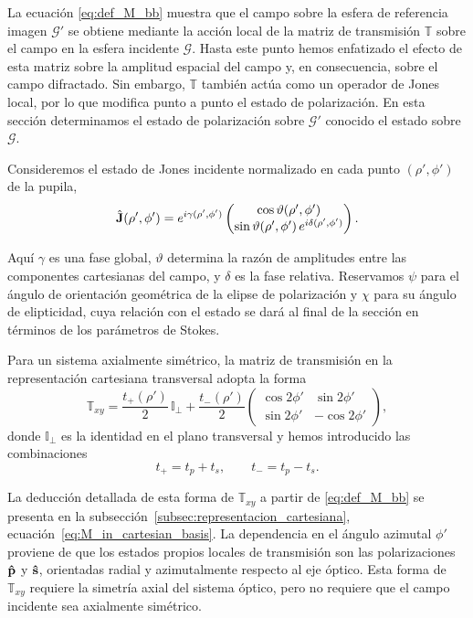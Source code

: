 La ecuación \eqref{eq:def_M_bb} muestra que el campo sobre la esfera de
referencia imagen $\mathscr{G}'$ se obtiene mediante la acción local de la
matriz de transmisión $\mathbb{T}$ sobre el campo en la esfera incidente
$\mathscr{G}$. Hasta este punto hemos enfatizado el efecto de esta matriz
sobre la amplitud espacial del campo y, en consecuencia, sobre el campo
difractado. Sin embargo, $\mathbb{T}$ también actúa como un operador de Jones
local, por lo que modifica punto a punto el estado de polarización. En esta
sección determinamos el estado de polarización sobre $\mathscr{G}'$
conocido el estado sobre $\mathscr{G}$.

Consideremos el estado de Jones incidente normalizado en cada punto
$(\rho',\phi')$ de la pupila,
\begin{equation}
\hat{\vb J}(\rho',\phi')
=
e^{i\gamma(\rho',\phi')}
\begin{pmatrix}
\cos \vartheta(\rho',\phi') \\
\sin \vartheta(\rho',\phi')\, e^{i\delta(\rho',\phi')}
\end{pmatrix}.
\label{eq:jones_state_pupila}
\end{equation}

Aquí $\gamma$ es una fase global, $\vartheta$ determina la razón de
amplitudes entre las componentes cartesianas del campo, y $\delta$ es la fase
relativa. Reservamos $\psi$ para el ángulo de orientación geométrica de la
elipse de polarización y $\chi$ para su ángulo de elipticidad, cuya relación
con el estado se dará al final de la sección en términos de los parámetros
de Stokes.

Para un sistema axialmente simétrico, la matriz de transmisión en la
representación cartesiana transversal adopta la forma
\begin{equation}
\mathbb{T}_{xy}
=
\frac{t_+(\rho')}{2}\,\mathbb{I}_{\perp}
+
\frac{t_-(\rho')}{2}
\begin{pmatrix}
\cos 2\phi' & \sin 2\phi' \\
\sin 2\phi' & -\cos 2\phi'
\end{pmatrix},
\label{eq:T_xy_jones}
\end{equation}
donde $\mathbb{I}_{\perp}$ es la identidad en el plano transversal y hemos
introducido las combinaciones
\begin{equation}
t_+
=
t_p+t_s,
\qquad
t_-
=
t_p-t_s.
\label{eq:t_plus_t_minus_def}
\end{equation}

La deducción detallada de esta forma de $\mathbb{T}_{xy}$ a partir de
\eqref{eq:def_M_bb} se presenta en la
subsección~\ref{subsec:representacion_cartesiana},
ecuación~\eqref{eq:M_in_cartesian_basis}. La dependencia en el ángulo azimutal
$\phi'$ proviene de que los estados propios locales de transmisión son las
polarizaciones $\bm{\hat{\mathbf{p}}}$ y $\bm{\hat{\mathbf{s}}}$, orientadas radial y
azimutalmente respecto al eje óptico. Esta forma de $\mathbb{T}_{xy}$ requiere
la simetría axial del sistema óptico, pero no requiere que el campo incidente
sea axialmente simétrico.

